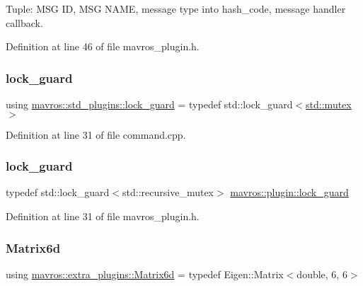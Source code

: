 Tuple\+: M\+SG ID, M\+SG N\+A\+ME, message type into hash\+\_\+code, message handler callback. 



Definition at line 46 of file mavros\+\_\+plugin.\+h.

\mbox{\label{group__plugin_gaf7a417aa5096c3eb3c0856187e77b766}} 
\subsubsection{\texorpdfstring{lock\_guard}{lock\_guard}\hspace{0.1cm}{\footnotesize\ttfamily [1/2]}}
{\footnotesize\ttfamily using \mbox{\hyperlink{group__plugin_gaf7a417aa5096c3eb3c0856187e77b766}{mavros\+::std\+\_\+plugins\+::lock\+\_\+guard}} = typedef std\+::lock\+\_\+guard$<$\mbox{\hyperlink{data_8c_a4acff8232e4aec9cd5c6dc200ac55ef3}{std\+::mutex}}$>$}



Definition at line 31 of file command.\+cpp.

\mbox{\label{group__plugin_ga191dd2c1abfed2baaa71d79dcaf19566}} 
\subsubsection{\texorpdfstring{lock\_guard}{lock\_guard}\hspace{0.1cm}{\footnotesize\ttfamily [2/2]}}
{\footnotesize\ttfamily typedef std\+::lock\+\_\+guard$<$std\+::recursive\+\_\+mutex$>$ \mbox{\hyperlink{group__plugin_ga191dd2c1abfed2baaa71d79dcaf19566}{mavros\+::plugin\+::lock\+\_\+guard}}}



Definition at line 31 of file mavros\+\_\+plugin.\+h.

\mbox{\label{group__plugin_gaf27101661ecc1fbce6f79a56a3982327}} 
\subsubsection{\texorpdfstring{Matrix6d}{Matrix6d}}
{\footnotesize\ttfamily using \mbox{\hyperlink{group__plugin_gaf27101661ecc1fbce6f79a56a3982327}{mavros\+::extra\+\_\+plugins\+::\+Matrix6d}} = typedef Eigen\+::\+Matrix$<$double, 6, 6$>$}



